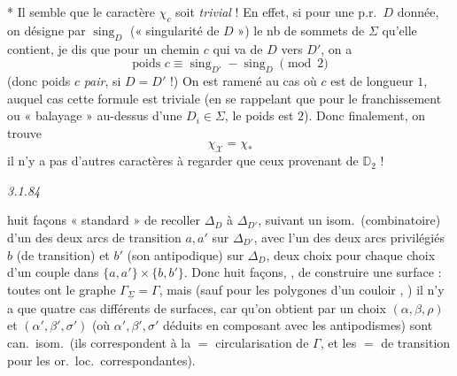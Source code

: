 \documentclass[11pt,a4paper]{article}
\begin{document}
* Il semble que le caractère $\chi_c$ soit \emph{trivial} ! En effet, si pour une p.r.\ $D$ donnée, on désigne par $\operatorname{sing}_D$ (« singularité de $D$ ») le nb de sommets de $\Sigma$ qu'elle contient, je dis que pour un chemin $c$ qui va de $D$ vers $D'$, on a
\[
\text{poids } c \equiv \operatorname{sing}_{D'} - \operatorname{sing}_D \pmod 2
\]
(donc poids $c$ \emph{pair}, si $D = D'$ !) On est ramené au cas où $c$ est de longueur $1$, auquel cas cette formule est triviale (en se rappelant que pour le franchissement  ou « balayage » au-dessus d'une  $D_i \in \Sigma$, le poids est $2$). Donc finalement, on trouve
\[
\boxed{\chi_{\mathcal{X}} = \chi_{\ast}}
\]
il n'y a pas d'autres caractères à regarder que ceux provenant de $\mathbb{D}_2$ !

\emph{3.1.84}


\ill{} huit façons « standard » de recoller $\Delta_D$ à $\Delta_{D'}$, suivant \struck{\ill{}} un isom.\ (combinatoire) d'un des deux arcs de transition $a, a'$ sur $\Delta_{D'}$, avec l'un des deux arcs privilégiés $b$ (de transition) et $b'$ (son antipodique) sur $\Delta_D$, deux choix pour chaque choix d'un couple dans $\lbrace a, a' \rbrace \times \lbrace b, b' \rbrace$. Donc huit façons,  , de construire une surface : toutes ont le graphe $\Gamma_{\underline{\Sigma}} = \Gamma$, mais (sauf pour les polygones d'un couloir , ) il n'y a que quatre cas différents de surfaces, car  qu'on obtient par un choix $(\alpha, \beta, \rho)$  et $(\alpha', \beta', \sigma')$ (où $\alpha', \beta', \sigma'$ déduits en composant avec les antipodismes) sont can.\ isom.\ (ils correspondent à la $=$ circularisation de $\Gamma$, et les $=$  de transition pour les or.\ loc.\ correspondantes).
\end{document}
